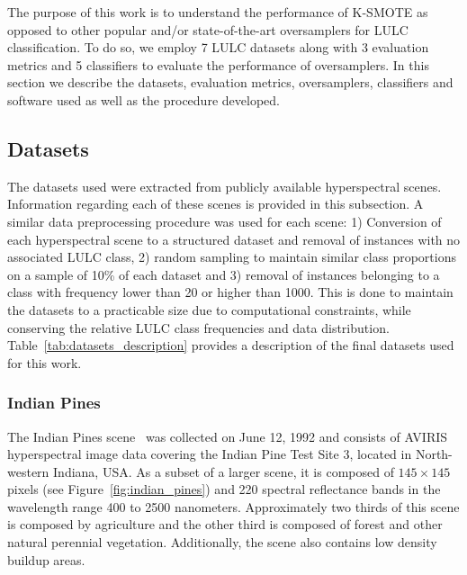 \documentclass[parskip=full]{scrartcl}
\begin{document}
The purpose of this work is to understand the performance of K-SMOTE as opposed
to other popular and/or state-of-the-art oversamplers for LULC classification.
To do so, we employ 7 LULC datasets along with 3 evaluation metrics and 5
classifiers to evaluate the performance of oversamplers. In this section we
describe the datasets, evaluation metrics, oversamplers, classifiers and
software used as well as the procedure developed.

\subsection{Datasets}

The datasets used were extracted from publicly available hyperspectral scenes.
Information regarding each of these scenes is provided in this subsection. A
similar data preprocessing procedure was used for each scene: 1) Conversion of
each hyperspectral scene to a structured dataset and removal of instances with
no associated LULC class, 2) random sampling to maintain similar class
proportions on a sample of 10\% of each dataset and 3) removal of instances
belonging to a class with frequency lower than 20 or higher than 1000. This is
done to maintain the datasets to a practicable size due to computational
constraints, while conserving the relative LULC class frequencies and data
distribution. Table~\ref{tab:datasets_description} provides a description of the
final datasets used for this work.


\subsubsection*{Indian Pines} 

The Indian Pines scene~\cite{Baumgardner2015} was collected on June 12, 1992 and
consists of AVIRIS hyperspectral image data covering the Indian Pine Test Site
3, located in North-western Indiana, USA. As a subset of a larger scene, it is
composed of $145 \times 145$ pixels (see Figure~\ref{fig:indian_pines}) and 220
spectral reflectance bands in the wavelength range 400 to 2500 nanometers.
Approximately two thirds of this scene is composed by agriculture and the other
third is composed of forest and other natural perennial vegetation.
Additionally, the scene also contains low density buildup areas.
\end{document}
